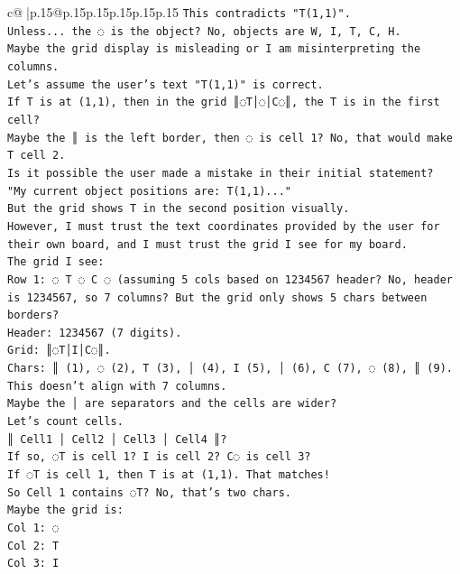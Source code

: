 \documentclass{article}
\begin{document}
{\begin{supertabular}{c@{$\;$}|p{.15\linewidth}@{}p{.15\linewidth}p{.15\linewidth}p{.15\linewidth}p{.15\linewidth}p{.15\linewidth}}
{{{\texttt{This contradicts "T(1,1)".} \\
\texttt{Unless... the ◌ is the object? No, objects are W, I, T, C, H.} \\
\texttt{Maybe the grid display is misleading or I am misinterpreting the columns.} \\
\texttt{Let's assume the user's text "T(1,1)" is correct.} \\
\texttt{If T is at (1,1), then in the grid ║◌T│◌│C◌║, the T is in the first cell?} \\
\texttt{Maybe the ║ is the left border, then ◌ is cell 1? No, that would make T cell 2.} \\
\texttt{Is it possible the user made a mistake in their initial statement?} \\
\texttt{"My current object positions are: T(1,1)..."} \\
\texttt{But the grid shows T in the second position visually.} \\
\texttt{However, I must trust the text coordinates provided by the user for their own board, and I must trust the grid I see for my board.} \\
\texttt{The grid I see:} \\
\texttt{Row 1: ◌ T ◌ C ◌ (assuming 5 cols based on 1234567 header? No, header is 1234567, so 7 columns? But the grid only shows 5 chars between borders?} \\
\texttt{Header:  1234567 (7 digits).} \\
\texttt{Grid: ║◌T│I│C◌║.} \\
\texttt{Chars: ║ (1), ◌ (2), T (3), │ (4), I (5), │ (6), C (7), ◌ (8), ║ (9).} \\
\texttt{This doesn't align with 7 columns.} \\
\texttt{Maybe the │ are separators and the cells are wider?} \\
\texttt{Let's count cells.} \\
\texttt{║ Cell1 │ Cell2 │ Cell3 │ Cell4 ║?} \\
\texttt{If so, ◌T is cell 1? I is cell 2? C◌ is cell 3?} \\
\texttt{If ◌T is cell 1, then T is at (1,1). That matches!} \\
\texttt{So Cell 1 contains ◌T? No, that's two chars.} \\
\texttt{Maybe the grid is:} \\
\texttt{Col 1: ◌} \\
\texttt{Col 2: T} \\
\texttt{Col 3: I} \\
}}}
\end{supertabular}}
\end{document}
